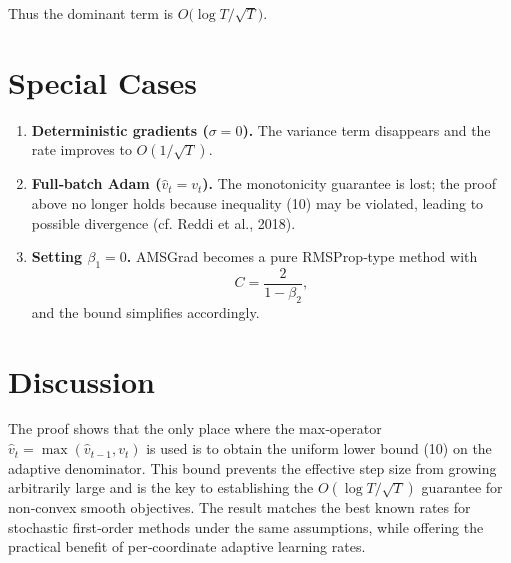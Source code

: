 \documentclass{article}
\begin{document}
Thus the dominant term is $O\!\bigl(\log T/\sqrt{T}\bigr)$.

\section*{Special Cases}
\begin{enumerate}[leftmargin=*]
\item \textbf{Deterministic gradients ($\sigma=0$).} The variance term disappears and the rate improves to $O(1/\sqrt{T})$.
\item \textbf{Full‑batch Adam ($\widehat v_t=v_t$).} The monotonicity guarantee is lost; the proof above no longer holds because inequality (10) may be violated, leading to possible divergence (cf. Reddi et al., 2018).
\item \textbf{Setting $\beta_1=0$.} AMSGrad becomes a pure RMSProp‑type method with
\[
C=\frac{2}{1-\beta_2},
\]
and the bound simplifies accordingly.
\end{enumerate}

\section*{Discussion}
The proof shows that the only place where the max‑operator $\widehat v_t=\max(\widehat v_{t-1},v_t)$ is used is to obtain the uniform lower bound (10) on the adaptive denominator.  This bound prevents the effective step size from growing arbitrarily large and is the key to establishing the $O(\log T/\sqrt{T})$ guarantee for non‑convex smooth objectives.  The result matches the best known rates for stochastic first‑order methods under the same assumptions, while offering the practical benefit of per‑coordinate adaptive learning rates.
\end{document}
